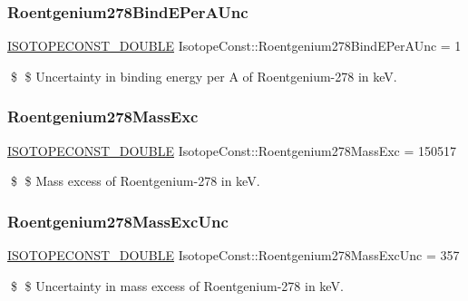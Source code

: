 \subsubsection{\texorpdfstring{Roentgenium278\+Bind\+E\+Per\+A\+Unc}{Roentgenium278BindEPerAUnc}}
{\footnotesize\ttfamily \mbox{\hyperlink{group___isotope_const-_macros_ga8f45a7272ce02c0b4c65c44636ed719a}{I\+S\+O\+T\+O\+P\+E\+C\+O\+N\+S\+T\+\_\+\+D\+O\+U\+B\+LE}} Isotope\+Const\+::\+Roentgenium278\+Bind\+E\+Per\+A\+Unc = 1}

\$ \$ Uncertainty in binding energy per A of Roentgenium-\/278 in keV. \mbox{\label{group___isotope_const-_roentgenium-_rg278_gae5a155d04b3be74bdd838bf601e10ade}} 
\subsubsection{\texorpdfstring{Roentgenium278\+Mass\+Exc}{Roentgenium278MassExc}}
{\footnotesize\ttfamily \mbox{\hyperlink{group___isotope_const-_macros_ga8f45a7272ce02c0b4c65c44636ed719a}{I\+S\+O\+T\+O\+P\+E\+C\+O\+N\+S\+T\+\_\+\+D\+O\+U\+B\+LE}} Isotope\+Const\+::\+Roentgenium278\+Mass\+Exc = 150517}

\$ \$ Mass excess of Roentgenium-\/278 in keV. \mbox{\label{group___isotope_const-_roentgenium-_rg278_ga77c393783f5aa787c71a1b779ff9989f}} 
\subsubsection{\texorpdfstring{Roentgenium278\+Mass\+Exc\+Unc}{Roentgenium278MassExcUnc}}
{\footnotesize\ttfamily \mbox{\hyperlink{group___isotope_const-_macros_ga8f45a7272ce02c0b4c65c44636ed719a}{I\+S\+O\+T\+O\+P\+E\+C\+O\+N\+S\+T\+\_\+\+D\+O\+U\+B\+LE}} Isotope\+Const\+::\+Roentgenium278\+Mass\+Exc\+Unc = 357}

\$ \$ Uncertainty in mass excess of Roentgenium-\/278 in keV. \mbox{\label{group___isotope_const-_roentgenium-_rg278_ga4334a548a7a6bab22680be2939f1e089}} 
